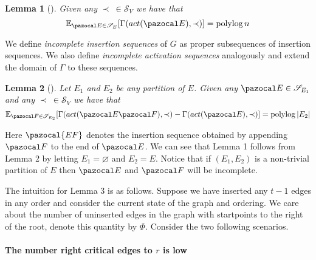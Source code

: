 \documentclass{report}
\newtheorem{lemma}{Lemma}
\DeclareMathOperator*{\polylog}{polylog}
\begin{document}
\begin{lemma}[\color{red}{UNPROVEN}\color{black}] Given any $\prec \: \in \mathcal S_V$ we have that
\[ \mathbb E_{\pazocal E \in \mathcal S_E}[\Gamma(act(\pazocal E), \prec)] = \polylog n \]
\end{lemma}

We define \textit{incomplete insertion sequences} of $G$ as proper subsequences of insertion sequences. We also define \textit{incomplete activation sequences} analogously and extend the domain of $\Gamma$ to these sequences.

\begin{lemma}[\color{red}{UNPROVEN}\color{black}]
Let $E_1$ and $E_2$ be any partition of $E$. Given any $\pazocal E \in \mathcal S_{E_1}$ and any $\prec \: \in \mathcal S_V$ we have that
\[ \mathbb E_{\pazocal F \in \mathcal S_{E_2}}[\Gamma(act(\pazocal E \pazocal F), \prec) - \Gamma(act(\pazocal E), \prec)] = \polylog{\vert E_2 \vert} \]
\end{lemma}

Here $\pazocal{EF}$ denotes the insertion sequence obtained by appending $\pazocal F$ to the end of $\pazocal E$. We can see that Lemma 1 follows from Lemma 2 by letting $E_1 = \varnothing$ and $E_2 = E$. Notice that if $(E_1, E_2)$ is a non-trivial partition of $E$ then $\pazocal E$ and $\pazocal F$ will be incomplete.


The intuition for Lemma 3 is as follows. Suppose we have inserted any $t-1$ edges in any order and consider the current state of the graph and ordering. We care about the number of uninserted edges in the graph with startpoints to the right of the root, denote this quantity by $\Phi$. Consider the two following scenarios.

\paragraph{The number right critical edges to $r$ is low}
\end{document}
